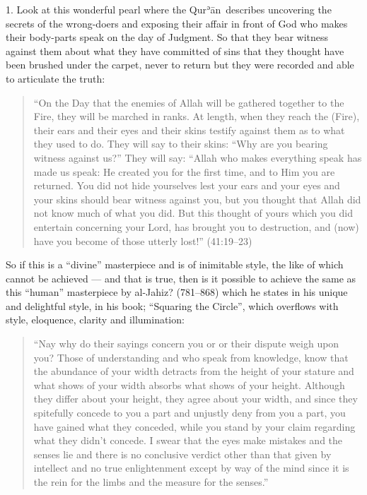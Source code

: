 \documentclass[12pt]{memoir}
\def\´{ʾ} %
\def \Quran{Qur\-\´ān} %
\def\–{-\hskip0pt}
\newcommand{\QRef}[1]{{\color{darkblue}#1}}
\begin{document}
1. Look at this wonderful pearl where the \Quran\ describes uncovering
the secrets of the wrong\–doers and exposing their affair in front of God
who makes their body-parts speak on the day of Judgment.
So that they bear witness against them about what they have committed of sins
that they thought have been brushed under the carpet,
never to return but they were recorded and able to articulate the truth:

\begin{quote}
“On the Day that the enemies of Allah will be gathered together to the Fire,
they will be marched in ranks.
At length, when they reach the (Fire),
their ears and their eyes and their skins testify against them
as to what they used to do.
They will say to their skins: “Why are you bearing witness against us?”
They will say: “Allah who makes everything speak has made us speak:
He created you for the first time, and to Him you are returned.
You did not hide yourselves lest your ears and your eyes and
your skins should bear witness against you,
but you thought that Allah did not know much of what you did.
But this thought of yours which you did entertain concerning your Lord,
has brought you to destruction,
and (now) have you become of those utterly lost!” (\QRef{41:19–23})
\end{quote}

So if this is a “divine” masterpiece and is of inimitable style,
the like of which cannot be achieved —
and that is true, then is it possible to achieve
the same as this “human” masterpiece by al\–Jahiz? (781–868)
which he states in his unique and delightful style, in his book;
“Squaring the Circle”, which overflows with style,
eloquence, clarity and illumination:

\begin{quote}
“Nay why do their sayings concern you or or their dispute weigh upon you?
Those of understanding and who speak from knowledge,
know that the abundance of your width detracts from the height of your stature
and what shows of your width absorbs what shows of your height.
Although they differ about your height, they agree about your width,
and since they spitefully concede to you a part and
unjustly deny from you a part, you have gained what they conceded,
while you stand by your claim regarding what they didn’t concede.
I swear that the eyes make mistakes and the senses lie and
there is no conclusive verdict other than that given by intellect and
no true enlightenment except by way of the mind since it is the rein
for the limbs and the measure for the senses.”\footnotemark
\end{quote}
\end{document}
